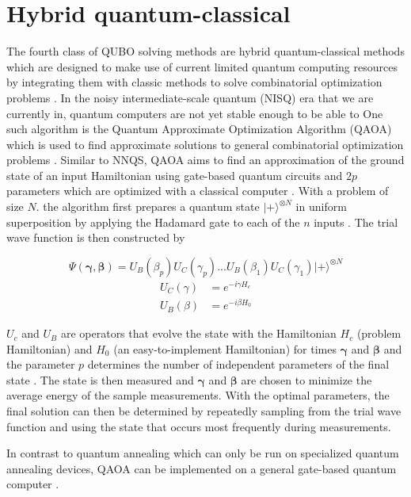 \section{Hybrid quantum-classical}
The fourth class of QUBO solving methods are hybrid quantum-classical methods which are designed to make use of current limited quantum computing resources by integrating them with classic methods to solve combinatorial optimization problems \cite{b32}. In the noisy intermediate-scale quantum (NISQ) era that we are currently in, quantum computers are not yet stable enough to be able to  One such algorithm is the Quantum Approximate Optimization Algorithm (QAOA) which is used to find approximate solutions to general combinatorial optimization problems \cite{b23}. Similar to NNQS, QAOA aims to find an approximation of the ground state of an input Hamiltonian using gate-based quantum circuits and $2p$ parameters which are optimized with a classical computer \cite{b34}. With a problem of size $N$. the algorithm first prepares a quantum state $| + \rangle^{\otimes N}$ in uniform superposition by applying the Hadamard gate to each of the $n$ inputs \cite{b34}. The trial wave function is then constructed by

\begin{equation}
    \Psi(\boldsymbol{\gamma}, \boldsymbol{\beta}) = U_B(\beta_p) U_C(\gamma_p)...U_B(\beta_1) U_C(\gamma_1) | + \rangle^{\otimes N}
\end{equation}
\begin{align*}
    U_C(\gamma) &= e^{-i\gamma H_c} \\
    U_B(\beta) &= e^{-i\beta H_0}
\end{align*}

$U_c$ and $U_B$ are operators that evolve the state with the Hamiltonian $H_c$ (problem Hamiltonian) and $H_0$ (an easy-to-implement Hamiltonian) for times $\boldsymbol{\gamma}$ and $\boldsymbol{\beta}$ and the parameter $p$ determines the number of independent parameters of the final state \cite{b34}. The state is then measured and $\boldsymbol{\gamma}$ and $\boldsymbol{\beta}$ are chosen to minimize the average energy of the sample measurements. With the optimal parameters, the final solution can then be determined by repeatedly sampling from the trial wave function and using the state that occurs most frequently during measurements.

In contrast to quantum annealing which can only be run on specialized quantum annealing devices, QAOA can be implemented on a general gate-based quantum computer \cite{b22}. 